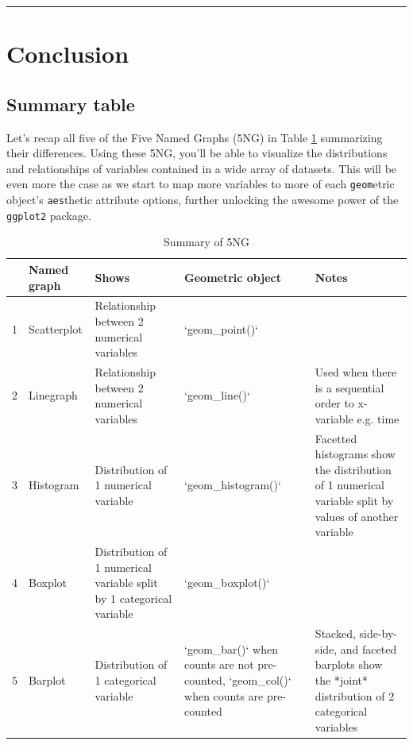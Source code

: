 \documentclass[12pt, krantz2,]{krantz}
\begin{document}
\begin{center}\rule{0.5\linewidth}{\linethickness}\end{center}

\hypertarget{conclusion-1}{%
\section{Conclusion}\label{conclusion-1}}

\hypertarget{summary-table}{%
\subsection{Summary table}\label{summary-table}}

Let's recap all five of the Five Named Graphs (5NG) in Table \ref{tab:viz-summary-table} summarizing their differences. Using these 5NG, you'll be able to visualize the distributions and relationships of variables contained in a wide array of datasets. This will be even more the case as we start to map more variables to more of each \texttt{geom}etric object's \texttt{aes}thetic attribute options, further unlocking the awesome power of the \texttt{ggplot2} package.

\begin{table}[H]

\caption{\label{tab:viz-summary-table}Summary of 5NG}
\centering
\fontsize{10}{12}\selectfont
\begin{tabular}{rl>{\raggedright\arraybackslash}p{0.75in}>{\raggedright\arraybackslash}p{1.1in}>{\raggedright\arraybackslash}p{1.1in}}
\toprule
  & Named graph & Shows & Geometric object & Notes\\
\midrule
1 & Scatterplot & Relationship between 2 numerical variables & `geom\_point()` & \\
2 & Linegraph & Relationship between 2 numerical variables & `geom\_line()` & Used when there is a sequential order to x-variable e.g. time\\
3 & Histogram & Distribution of 1 numerical variable & `geom\_histogram()` & Facetted histograms show the distribution of 1 numerical variable split by values of another variable\\
4 & Boxplot & Distribution of 1 numerical variable split by 1 categorical variable & `geom\_boxplot()` & \\
5 & Barplot & Distribution of 1 categorical variable & `geom\_bar()` when counts are not pre-counted, `geom\_col()` when counts are pre-counted & Stacked, side-by-side, and faceted barplots show the *joint* distribution of 2 categorical variables\\
\bottomrule
\end{tabular}
\end{table}
\end{document}

